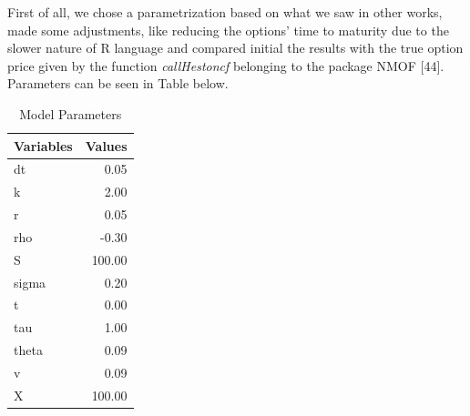 \documentclass[12pt,twoside]{reedthesis}
\theoremstyle{definition}
\theoremstyle{definition}
\theoremstyle{remark}
\begin{document}
  First of all, we chose a parametrization based on what we saw in other
  works, made some adjustments, like reducing the options' time to
  maturity due to the slower nature of R language and compared initial the
  results with the true option price given by the function
  \emph{callHestoncf} belonging to the package NMOF {[}44{]}. Parameters
  can be seen in Table below.
  \begin{table}[ht]
  \centering
  \begingroup\fontsize{11pt}{13pt}\selectfont
  \begin{tabular}{lr}
    \hline 
  Variables & Values \\ 
    \hline 
  dt & 0.05 \\ 
    k & 2.00 \\ 
    r & 0.05 \\ 
    rho & -0.30 \\ 
    S & 100.00 \\ 
    sigma & 0.20 \\ 
    t & 0.00 \\ 
    tau & 1.00 \\ 
    theta & 0.09 \\ 
    v & 0.09 \\ 
    X & 100.00 \\ 
     \hline 
  \end{tabular}
  \endgroup
  \caption{Model Parameters} 
  \label{param}
  \end{table}
  \clearpage
  
\end{document}
